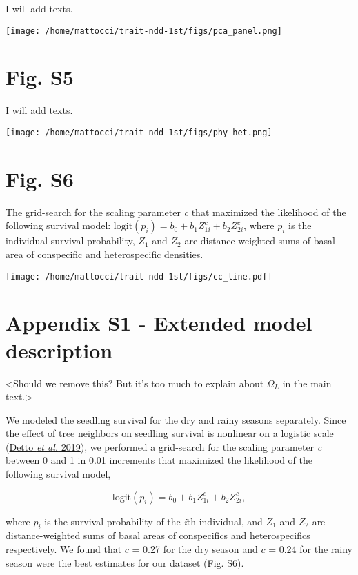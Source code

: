 \documentclass[
  12pt,
  letterpaper,
  DIV=11,
  numbers=noendperiod]{scrartcl}
\begin{document}
I will add texts.

\texttt{[image: /home/mattocci/trait-ndd-1st/figs/pca\_panel.png]}

\newpage

\hypertarget{fig.-s5}{%
\section{Fig. S5}\label{fig.-s5}}

I will add texts.

\texttt{[image: /home/mattocci/trait-ndd-1st/figs/phy\_het.png]}

\newpage

\hypertarget{fig.-s6}{%
\section{Fig. S6}\label{fig.-s6}}

The grid-search for the scaling parameter \emph{c} that maximized the
likelihood of the following survival model:
\(\mathrm{logit}(p_i) = b_0 + b_1 Z_{1i}^c + b_2 Z_{2i}^c\), where
\(p_i\) is the individual survival probability, \(Z_1\) and \(Z_2\) are
distance-weighted sums of basal area of conspecific and heterospecific
densities.

\texttt{[image: /home/mattocci/trait-ndd-1st/figs/cc\_line.pdf]}

\newpage

\hypertarget{appendix-s1---extended-model-description}{%
\section{Appendix S1 - Extended model
description}\label{appendix-s1---extended-model-description}}

\textless Should we remove this? But it's too much to explain about
\(\Omega_L\) in the main text.\textgreater{}

We modeled the seedling survival for the dry and rainy seasons
separately. Since the effect of tree neighbors on seedling survival is
nonlinear on a logistic scale (\protect\hyperlink{ref-Detto2019}{Detto
\emph{et al.} 2019}), we performed a grid-search for the scaling
parameter \emph{c} between 0 and 1 in 0.01 increments that maximized the
likelihood of the following survival model,

\[
\mathrm{logit}(p_i) = b_0 + b_1 Z_{1i}^c + b_2 Z_{2i}^c,
\]

where \(p_i\) is the survival probability of the \emph{i}th individual,
and \(Z_1\) and \(Z_2\) are distance-weighted sums of basal areas of
conspecifics and heterospecifics respectively. We found that \(c\) =
0.27 for the dry season and \(c\) = 0.24 for the rainy season were the
best estimates for our dataset (Fig. S6).
\end{document}
